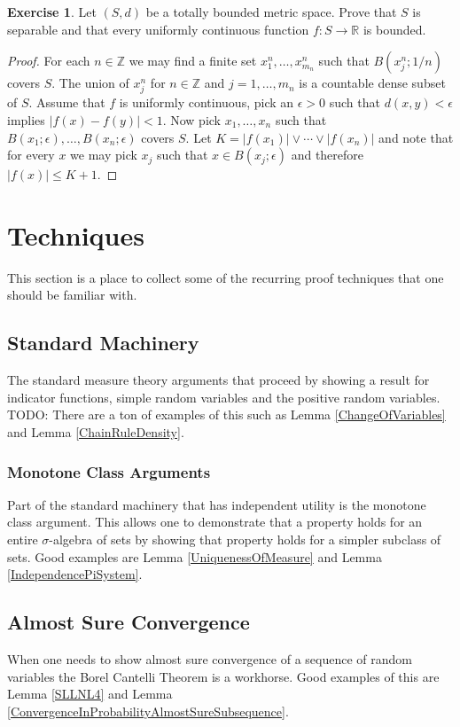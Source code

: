 \documentclass{amsbook}
\theoremstyle{definition}
\newtheorem{xca}{Exercise}
\theoremstyle{remark}
\newcommand{\reals}{\mathbb{R}}
\newcommand{\integers}{\mathbb{Z}}
\newcommand{\abs}[1]{\left \vert #1 \right \vert}
\begin{document}
\begin{xca}Let $(S,d)$ be a totally bounded metric space.  Prove that $S$ is separable and that every uniformly continuous function $f : S \to \reals$ is bounded.
\end{xca}
\begin{proof}For each $n \in \integers$ we may find a finite set $x^n_1, \dots, x^n_{m_n}$ such that $B(x^n_j; 1/n)$ covers $S$.  The union of $x^n_{j}$ for $n \in \integers$ and $j=1, \dotsc, m_n$ is a countable dense subset of $S$.  Assume that $f$ is uniformly continuous, pick an $\epsilon > 0$ such that $d(x,y) < \epsilon$ implies $\abs{f(x) - f(y)} < 1$.  Now pick $x_1, \dotsc, x_n$ such that $B(x_1; \epsilon), \dotsc, B(x_n; \epsilon)$ covers $S$.  Let $K = \abs{f(x_1)} \vee \dotsb \vee \abs{f(x_n)}$ and note that for every $x$ we may pick $x_j$ such that $x \in B(x_j; \epsilon)$ and therefore $\abs{f(x)} \leq K + 1$.
\end{proof}


\appendix
\chapter{Techniques}

This section is a place to collect some of the recurring proof
techniques that one should be familiar with.

\section{Standard Machinery}
The standard measure theory arguments that proceed by showing a result
for indicator functions, simple random variables and the positive
random variables.  TODO:  There are a ton of examples of this such as
Lemma \ref{ChangeOfVariables} and Lemma \ref{ChainRuleDensity}.

\subsection{Monotone Class Arguments}
Part of the standard machinery that has independent utility is the
monotone class argument.  This allows one to demonstrate that a
property holds for an entire $\sigma$-algebra of sets by showing that
property holds for a simpler subclass of sets.  Good examples are
Lemma \ref{UniquenessOfMeasure} and Lemma \ref{IndependencePiSystem}.

\section{Almost Sure Convergence}
When one needs to show almost sure convergence of a sequence of random
variables the Borel Cantelli Theorem is a workhorse.  Good examples of
this are Lemma \ref{SLLNL4} and Lemma
\ref{ConvergenceInProbabilityAlmostSureSubsequence}.
\end{document}
